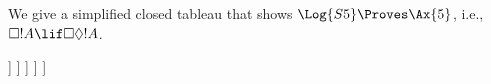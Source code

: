 \documentclass[../../../include/open-logic-section]{subfiles}
\begin{document}
\begin{ex}
  We give a simplified closed tableau that shows $\Log{S5} \Proves
  \Ax{5}$, i.e., $\Box!A \lif \Box\Diamond!A$.
  \begin{oltableau}
    [\pFmla{\False}{\Box\formula{A} \lif \Box\Diamond \formula{A}}{1},
      just = \TAss
      [\pFmla{\True}{\Box \formula{A}}{1}, just = {\TRule{\False}{\lif}[1]}
        [\pFmla{\False}{\Box\Diamond \formula{A}}{1},
          just = {\TRule{\False}{\lif}[1]}
          [\pFmla{\False}{\Diamond \formula{A}}{2},
            just = {\TRule{\False}{\Box}[3]}
            [\pFmla{\False}{\formula{A}}{2},
              just = {\TRule{\False}{\Diamond}[4]}
                [\pFmla{\True}{\formula{A}}{2},
                  just = {\TRule{\True}{\Box}[2]}, close]
            ]
          ]
        ]
      ]
    ]
  \end{oltableau}
\end{ex}
\end{document}
